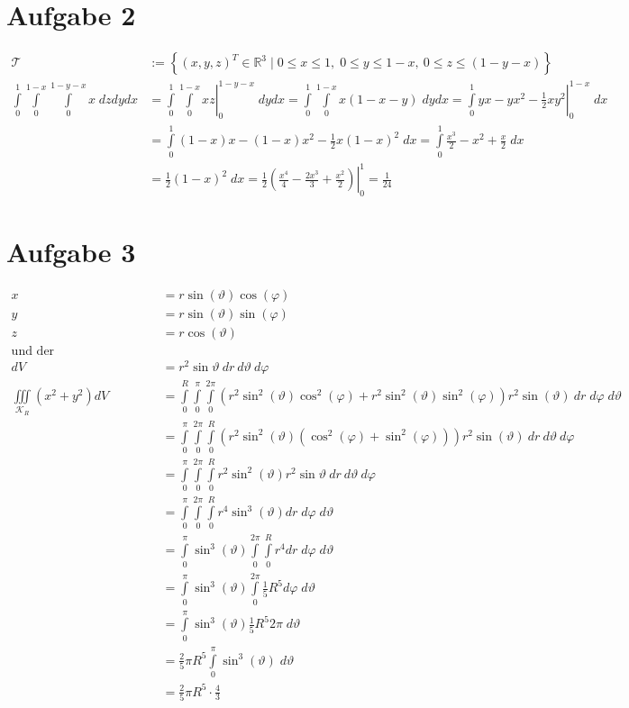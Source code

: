 \documentclass[10pt,a4paper,parskip=half]{scrartcl}
\newcommand{\R}{\mathbb{R}}
\begin{document}
\section*{Aufgabe 2}
\begin{align*}
\mathcal{T} &:= \left\lbrace (x,y,z)^T \in \R^3 \mid 0\leq x \leq 1, \; 0\leq y \leq 1 - x, \: 0 \leq z \leq (1 - y - x)\right\rbrace \\
   \int\limits^1_0 \int\limits^{1-x}_0 \int\limits^{1-y - x}_{0} x \;dzdydx &=  \left.  \int\limits^1_0 \int\limits^{1-x}_0  xz \right|^{1-y-x}_{0} \;dydx =   \int\limits^1_0 \int\limits^{1-x}_0  x(1-x-y) \;dydx = \left. \int\limits^{1}_{0}  yx - yx^2 - \frac 12 xy^2 \right|^{1-x}_{0} \;dx \\
   &= \int\limits^{1}_{0} (1-x)x - (1-x)x^2 - \frac 12 x(1-x)^2 \; dx =  \int\limits^{1}_{0} \frac{x^3}{2} - x^2 + \frac x2  \; dx \\
   &= \frac 12 (1 -x)^2 \;dx =  \left. \frac 12\left( \frac{x^4}{4} - \frac{2x^3}{3} + \frac{x^2}{2} \right) \right |^1_0 = \frac{1}{24}
\end{align*}
\section*{Aufgabe 3}
\begin{align*}
x &= r \sin( \vartheta ) \cos(\varphi) \\
y &= r \sin(\vartheta) \sin(\varphi)\\
z &= r \cos( \vartheta)\\
\text{und der Funktionaldeterminanten} \\
dV &= r^2 \sin \vartheta~ dr ~d\vartheta ~d\varphi \\
\iiint\limits_{\mathcal{K}_R} \left( x^2 + y^2 \right) dV &= \int\limits_{0}^{R}\int\limits_{0}^{\pi} \int\limits_{0}^{2\pi} \left( r^2\sin^2(\vartheta)\cos^2(\varphi) + r^2\sin^2(\vartheta)\sin^2(\varphi) \right) r^2 \sin(\vartheta)~ dr \; d\varphi \; d\vartheta\\ 
&= \int\limits_{0}^{\pi} \int\limits_{0}^{2\pi}\int\limits_{0}^{R} \left( r^2\sin^2(\vartheta) \left( \cos^2(\varphi) + \sin^2(\varphi) \right) \right)  r^2 \sin(\vartheta)~ dr ~d\vartheta ~d\varphi\\
&= \int\limits_{0}^{\pi} \int\limits_{0}^{2\pi}\int\limits_{0}^{R}  r^2\sin^2(\vartheta)  r^2 \sin \vartheta~ dr ~d\vartheta ~d\varphi\\
&= \int\limits_{0}^{\pi} \int\limits_{0}^{2\pi}\int\limits_{0}^{R}  r^4\sin^3(\vartheta) dr \; d\varphi \; d\vartheta\\
&= \int\limits_{0}^{\pi} \sin^3(\vartheta) \int\limits_{0}^{2\pi}\int\limits_{0}^{R} r^4 dr \; d\varphi \; d\vartheta\\
&= \int\limits_{0}^{\pi} \sin^3(\vartheta)  \int\limits_{0}^{2\pi} \frac 15 R^5 d\varphi \; d\vartheta\\
&= \int\limits_{0}^{\pi} \sin^3(\vartheta)\frac 15 R^5 2\pi \; d\vartheta\\
&= \frac 25 \pi R^5 \int\limits_0^{\pi} \sin^3(\vartheta) \; d\vartheta\\
&= \frac 25 \pi R^5 \cdot \frac 43
\end{align*}
\end{document}
